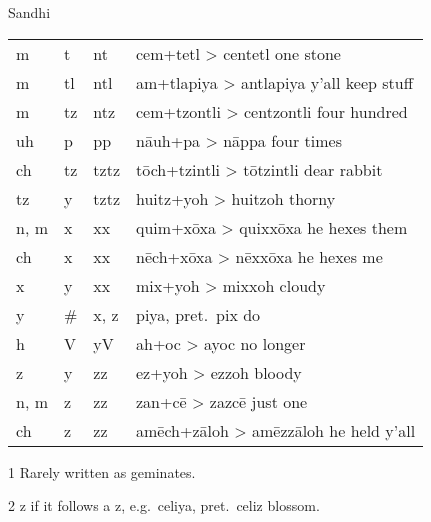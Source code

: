 \documentclass[12pt]{beamer}
\newcommand{\nah}[1]{\textcolor{nahgrn}{#1}}
\newcommand{\trs}[1]{\textcolor{nahblu}{#1}}
\begin{document}
\begin{frame}
\begin{columns}[t]
\begin{column}{.25\linewidth}
\begin{block}{Sandhi}
\begin{threeparttable}
\begin{tabular}{l@{+}l@{>}ll}
            \nah{m} & \nah{t} & \nah{nt} & \nah{cem}+\nah{tetl} > \nah{centetl} \trs{one stone} \\
            \nah{m} & \nah{tl} & \nah{ntl} & \nah{am}+\nah{tlapiya} > \nah{antlapiya} \trs{y'all keep stuff} \\
            \nah{m} & \nah{tz} & \nah{ntz} & \nah{cem}+\nah{tzontli} > \nah{centzontli} \trs{four hundred} \\
            \nah{uh} & \nah{p} & \nah{pp} & \nah{nāuh}+\nah{pa} > \nah{nāppa} \trs{four times} \\
            \nah{ch} & \nah{tz} & \nah{tztz}\tnote{1} & \nah{tōch}+\nah{tzintli} > \nah{tōtzintli} \trs{dear rabbit} \\
            \nah{tz} & \nah{y} & \nah{tztz}\tnote{1} & \nah{huitz}+\nah{yoh} > \nah{huitzoh} \trs{thorny} \\
            \nah{n, m} & \nah{x} & \nah{xx}\tnote{1} & \nah{quim}+\nah{xōxa} > \nah{quixxōxa} \trs{he hexes them} \\
            \nah{ch} & \nah{x} & \nah{xx}\tnote{1} & \nah{nēch}+\nah{xōxa} > \nah{nēxxōxa} \trs{he hexes me} \\
            \nah{x} & \nah{y} & \nah{xx}\tnote{1} & \nah{mix}+\nah{yoh} > \nah{mixxoh} \trs{cloudy} \\
            \nah{y} & \nah{\#} & \nah{x, z}\tnote{2}{} & \nah{piya}, pret.~\nah{pix} \trs{do} \\
            \nah{h} & \nah{V} & \nah{yV} & \nah{ah}+\nah{oc} > \nah{ayoc} \trs{no longer} \\
            \nah{z} & \nah{y} & \nah{zz}\tnote{1} & \nah{ez}+\nah{yoh} > \nah{ezzoh} \trs{bloody} \\
            \nah{n, m} & \nah{z} & \nah{zz}\tnote{1} & \nah{zan}+\nah{cē} > \nah{zazcē} \trs{just one} \\
            \nah{ch} & \nah{z} & \nah{zz}\tnote{1} & \nah{amēch}+\nah{zāloh} > \nah{amēzzāloh} \trs{he held y'all} \\
          \end{tabular}%
          \begin{tablenotes}
          \item[1] Rarely written as geminates.
          \item[2] \nah{z} if it follows a \nah{z}, e.g.~\nah{celiya}, pret.~\nah{celiz} \trs{blossom}.
            
          \end{tablenotes}
        \end{threeparttable}
      \end{block}
      

\end{column}
\end{columns}
\end{frame}
\end{document}
